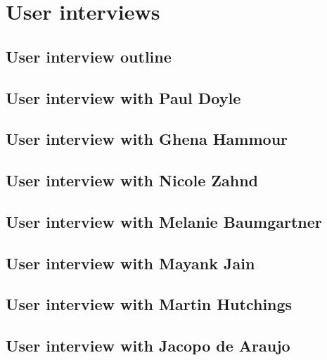\chapter{User interviews}
\label{appendix1-user-interviews}

\section*{User interview outline}

\section*{User interview with Paul Doyle}

\section*{User interview with Ghena Hammour}

\section*{User interview with Nicole Zahnd}

\section*{User interview with Melanie Baumgartner}

\section*{User interview with Mayank Jain}

\section*{User interview with Martin Hutchings}

\section*{User interview with Jacopo de Araujo}

